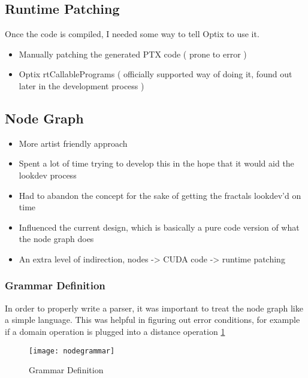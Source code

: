 \documentclass[11pt,a4paper,final,notitlepage]{report}
\begin{document}
\subsection{Runtime Patching}
Once the code is compiled, I needed some way to tell Optix to use it.

\begin{itemize}
	\item Manually patching the generated PTX code ( prone to error )
	\item Optix rtCallablePrograms ( officially supported way of doing it, found out later in the development process )
\end{itemize}

\subsection{Node Graph}

\begin{itemize}
	\item More artist friendly approach
	\item Spent a lot of time trying to develop this in the hope that it would aid the lookdev process
	\item Had to abandon the concept for the sake of getting the fractals lookdev'd on time
	\item Influenced the current design, which is basically a pure code version of what the node graph does
	\item An extra level of indirection, nodes -> CUDA code -> runtime patching
\end{itemize}

\subsubsection{Grammar Definition}
In order to properly write a parser, it was important to treat the node graph like a simple language. This was helpful in figuring out error conditions, for example if a domain operation is plugged into a distance operation \ref{fig:grammar}

\begin{figure}[h!]
	\texttt{[image: nodegrammar]}
	\caption{Grammar Definition}
	\label{fig:grammar}
\end{figure}



\nocite{*}



\end{document}

